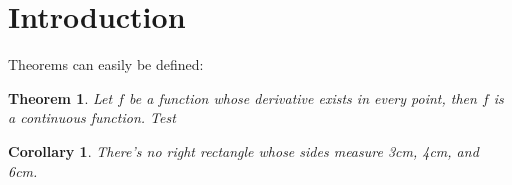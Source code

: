 \documentclass{article}
\newtheorem{theorem}{Theorem}
\newtheorem{corollary}{Corollary}
\begin{document}
\section{Introduction}
Theorems can easily be defined:

\begin{theorem}
Let \(f\) be a function whose derivative exists in every point, then \(f\)
is a continuous function. Test
\end{theorem}


\begin{corollary}
There's no right rectangle whose sides measure 3cm, 4cm, and 6cm.
\end{corollary}
\end{document}
